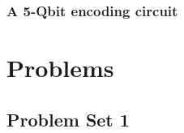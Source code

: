 \documentclass{book}
\theoremstyle{definition}
\begin{document}
\subsection{A 5-Qbit encoding circuit}

\newpage

%















\chapter{Problems}

\newpage

\section{Problem Set 1}
\end{document}
